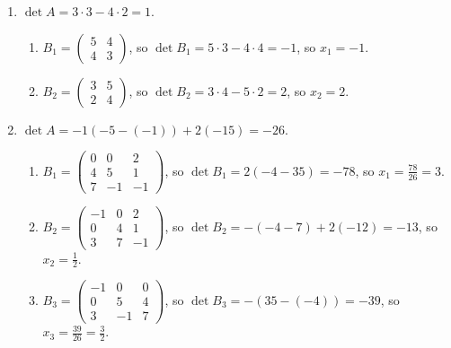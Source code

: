 \documentclass{homework}
\begin{document}
\begin{solution}
  \begin{enumerate}[label=(\alph*)]
    \item $\det{A}=3\cdot 3-4\cdot 2=1$. 
      \begin{enumerate}
        \item $B_1=\begin{pmatrix} 5&4\\4&3 \end{pmatrix} $, so $\det{B_1}=5\cdot 3-4\cdot 4=-1$, so
          $x_1=-1$.
        \item $B_2=\begin{pmatrix} 3&5\\2&4 \end{pmatrix} $, so $\det{B_2}=3\cdot 4-5\cdot 2=2$, so
          $x_2=2$.
      \end{enumerate}
    \item $\det{A}=-1(-5-(-1))+2(-15)=-26$.
      \begin{enumerate}
        \item $B_1=\begin{pmatrix} 0&0&2\\4&5&1\\7&-1&-1 \end{pmatrix} $, so
          $\det{B_1}=2(-4-35)=-78$, so $x_1=\frac{78}{26}=3$.
        \item $B_2=\begin{pmatrix} -1&0&2\\0&4&1\\3&7&-1 \end{pmatrix} $, so
          $\det{B_2}=-(-4-7)+2(-12)=-13$, so $x_2=\frac{1}{2}$.
        \item $B_3=\begin{pmatrix} -1&0&0\\0&5&4\\3&-1&7 \end{pmatrix} $, so
          $\det{B_3}=-(35-(-4))=-39$, so $x_3=\frac{39}{26}=\frac{3}{2}$.
      \end{enumerate}
  \end{enumerate}
\end{solution}
\end{document}
